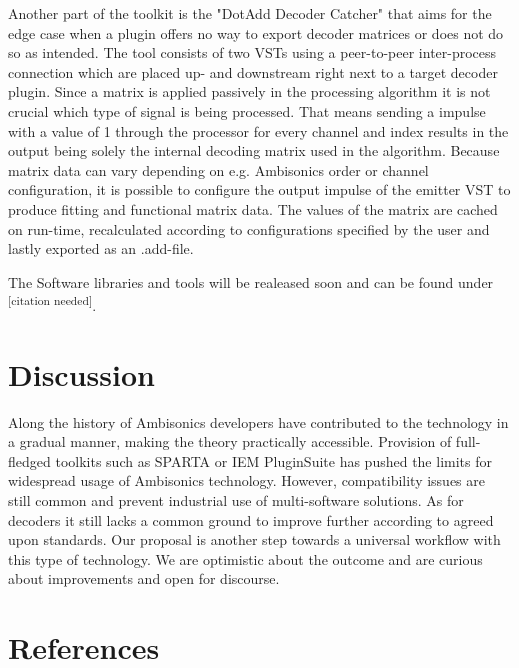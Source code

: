 \documentclass[a4paper, 10pt, twocolumn]{article}
\newcommand{\citationneeded}[1][]{\textsuperscript{\color{black} [citation needed]}}
\begin{document}
Another part of the toolkit is the "DotAdd Decoder Catcher" that aims for the edge case when a plugin offers no way to export decoder matrices or does not do so as intended. The tool consists of two VSTs using a peer-to-peer inter-process connection which are placed up- and downstream right next to a target decoder plugin. Since a matrix is applied passively in the processing algorithm it is not crucial which type of signal is being processed. That means sending a impulse with a value of 1 through the processor for every channel and index results in the output being solely the internal decoding matrix used in the algorithm. Because matrix data can vary depending on e.g. Ambisonics order or channel configuration, it is possible to configure the output impulse of the emitter VST to produce fitting and functional matrix data. The values of the matrix are cached on run-time, recalculated according to configurations specified by the user and lastly exported as an .add-file.


The Software libraries and tools will be realeased soon and can be found under \citationneeded{}.


\section{Discussion}\label{sec:Discussion}

Along the history of Ambisonics developers have contributed to the technology in a gradual manner, making the theory practically accessible. Provision of full-fledged toolkits such as SPARTA or IEM PluginSuite has pushed the limits for widespread usage of Ambisonics technology. However, compatibility issues are still common and prevent industrial use of multi-software solutions. 
As for decoders it still lacks a common ground to improve further according to agreed upon standards. Our proposal is another step towards a universal workflow with this type of technology. We are optimistic about the outcome and are curious about improvements and open for discourse.



\renewcommand\refname{}
\section{References}\label{sec:References}

\begingroup
\RaggedRight 		%

\printbibliography
\endgroup
\end{document}
